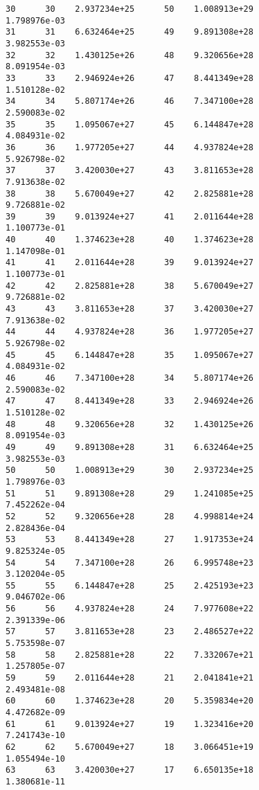 \documentclass[11pt]{article}
\begin{document}
\begin{Verbatim}[commandchars=\\\{\}]
30      30    2.937234e+25      50    1.008913e+29               1.798976e-03
31      31    6.632464e+25      49    9.891308e+28               3.982553e-03
32      32    1.430125e+26      48    9.320656e+28               8.091954e-03
33      33    2.946924e+26      47    8.441349e+28               1.510128e-02
34      34    5.807174e+26      46    7.347100e+28               2.590083e-02
35      35    1.095067e+27      45    6.144847e+28               4.084931e-02
36      36    1.977205e+27      44    4.937824e+28               5.926798e-02
37      37    3.420030e+27      43    3.811653e+28               7.913638e-02
38      38    5.670049e+27      42    2.825881e+28               9.726881e-02
39      39    9.013924e+27      41    2.011644e+28               1.100773e-01
40      40    1.374623e+28      40    1.374623e+28               1.147098e-01
41      41    2.011644e+28      39    9.013924e+27               1.100773e-01
42      42    2.825881e+28      38    5.670049e+27               9.726881e-02
43      43    3.811653e+28      37    3.420030e+27               7.913638e-02
44      44    4.937824e+28      36    1.977205e+27               5.926798e-02
45      45    6.144847e+28      35    1.095067e+27               4.084931e-02
46      46    7.347100e+28      34    5.807174e+26               2.590083e-02
47      47    8.441349e+28      33    2.946924e+26               1.510128e-02
48      48    9.320656e+28      32    1.430125e+26               8.091954e-03
49      49    9.891308e+28      31    6.632464e+25               3.982553e-03
50      50    1.008913e+29      30    2.937234e+25               1.798976e-03
51      51    9.891308e+28      29    1.241085e+25               7.452262e-04
52      52    9.320656e+28      28    4.998814e+24               2.828436e-04
53      53    8.441349e+28      27    1.917353e+24               9.825324e-05
54      54    7.347100e+28      26    6.995748e+23               3.120204e-05
55      55    6.144847e+28      25    2.425193e+23               9.046702e-06
56      56    4.937824e+28      24    7.977608e+22               2.391339e-06
57      57    3.811653e+28      23    2.486527e+22               5.753598e-07
58      58    2.825881e+28      22    7.332067e+21               1.257805e-07
59      59    2.011644e+28      21    2.041841e+21               2.493481e-08
60      60    1.374623e+28      20    5.359834e+20               4.472682e-09
61      61    9.013924e+27      19    1.323416e+20               7.241743e-10
62      62    5.670049e+27      18    3.066451e+19               1.055494e-10
63      63    3.420030e+27      17    6.650135e+18               1.380681e-11

\end{Verbatim}
\end{document}
